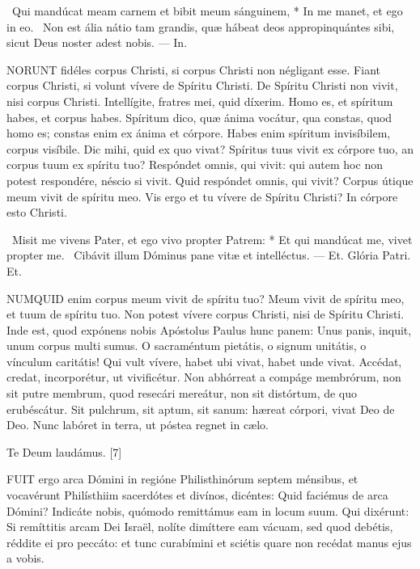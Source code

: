 \R\ Qui mandúcat meam carnem et bibit meum sánguinem, * In me manet, et ego in eo. \V\ Non est ália nátio tam grandis, quæ hábeat deos appropinquántes sibi, sicut Deus noster adest nobis. --- In.


\lettrine[lines=2]{N}{ORUNT} fidéles corpus Christi, si corpus Christi non négligant esse. Fiant corpus Christi, si volunt vívere de Spíritu Christi. De Spíritu Christi non vivit, nisi corpus Christi. Intellígite, fratres mei, quid díxerim. Homo es, et spíritum habes, et corpus habes. Spíritum dico, quæ ánima vocátur, qua constas, quod homo es; constas enim ex ánima et córpore. Habes enim spíritum invisíbilem, corpus visíbile. Dic mihi, quid ex quo vivat? Spíritus tuus vivit ex córpore tuo, an corpus tuum ex spíritu tuo? Respóndet omnis, qui vivit: qui autem hoc non potest respondére, néscio si vivit. Quid respóndet omnis, qui vivit? Corpus útique meum vivit de spíritu meo. Vis ergo et tu vívere de Spíritu Christi? In córpore esto Christi.

\R\ Misit me vivens Pater, et ego vivo propter Patrem: * Et qui mandúcat me, vivet propter me. \V\ Cibávit illum Dóminus pane vitæ et intelléctus. --- Et. Glória Patri. Et.


\lettrine[lines=2]{N}{UMQUID} enim corpus meum vivit de spíritu tuo? Meum vivit de spíritu meo, et tuum de spíritu tuo. Non potest vívere corpus Christi, nisi de Spíritu Christi. Inde est, quod expónens nobis Apóstolus Paulus hunc panem: Unus panis, inquit, unum corpus multi sumus. O sacraméntum pietátis, o signum unitátis, o vínculum caritátis! Qui vult vívere, habet ubi vivat, habet unde vivat. Accédat, credat, incorporétur, ut vivificétur. Non abhórreat a compáge membrórum, non sit putre membrum, quod resecári mereátur, non sit distórtum, de quo erubéscátur. Sit pulchrum, sit aptum, sit sanum: hæreat córpori, vivat Deo de Deo. Nunc labóret in terra, ut póstea regnet in cælo.

Te Deum laudámus. [7]






\lettrine[lines=2]{F}{UIT} ergo arca Dómini in regióne Philisthinórum septem ménsibus, et vocavérunt Philísthiim sacerdótes et divínos, dicéntes: Quid faciémus de arca Dómini? Indicáte nobis, quómodo remittámus eam in locum suum. Qui dixérunt: Si remíttitis arcam Dei Israël, nolíte dimíttere eam vácuam, sed quod debétis, réddite ei pro peccáto: et tunc curabímini et sciétis quare non recédat manus ejus a vobis.

